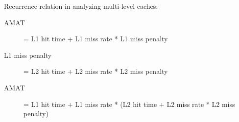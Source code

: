 Recurrence relation in analyzing multi-level caches:
\begin{description}
    \item[AMAT] = L1 hit time + L1 miss rate * L1 miss penalty
    \item[L1 miss penalty] = L2 hit time + L2 miss rate * L2 miss penalty
    \item[AMAT] = L1 hit time + L1 miss rate * (L2 hit time + L2 miss rate * L2 miss penalty)
\end{description}